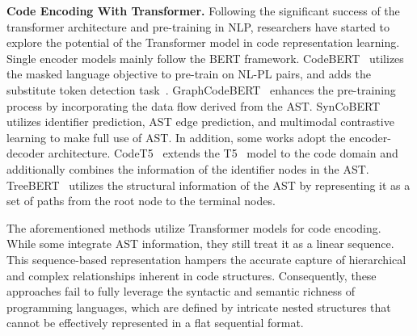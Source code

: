 \noindent 
\textbf{Code Encoding With Transformer.}
Following the significant success of the transformer architecture and pre-training in NLP, researchers have started to explore the potential of the Transformer model in code representation learning. Single encoder models mainly follow the BERT framework. CodeBERT~\citep{feng2020codebert} utilizes the masked language objective to pre-train on NL-PL pairs, and adds the substitute token detection task~\citep{clark2020electra}. GraphCodeBERT~\citep{guo2020graphcodebert} enhances the pre-training process by incorporating the data flow derived from the AST. SynCoBERT~\citep{wang2021syncobert} utilizes identifier prediction, AST edge prediction, and multimodal contrastive learning to make full use of AST. In addition, some works adopt the encoder-decoder architecture. 
CodeT5~\citep{wang2021codet5} extends the T5~\citep{raffel2020exploring} model to the code domain and additionally combines the information of the identifier nodes in the AST. TreeBERT~\citep{jiang2021treebert} utilizes the structural information of the AST by representing it as a set of paths from the root node to the terminal nodes. 

The aforementioned methods utilize Transformer models for code encoding. While some integrate AST information, they still treat it as a linear sequence. This sequence-based representation hampers the accurate capture of hierarchical and complex relationships inherent in code structures. Consequently, these approaches fail to fully leverage the syntactic and semantic richness of programming languages, which are defined by intricate nested structures that cannot be effectively represented in a flat sequential format.



